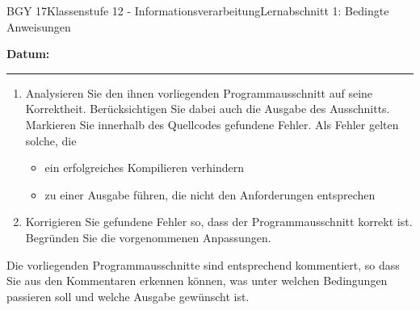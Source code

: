 \documentclass[oneside,openany,headings=optiontotoc,11pt,numbers=noenddot]{scrreprt}
\begin{document}
	\begin{worksheet}{BGY 17}{Klassenstufe 12 - Informationsverarbeitung}{Lernabschnitt 1: Bedingte Anweisungen}
				
		\noindent
		\sffamily
		\textbf{Datum:}
		\rule{0.91\textwidth}{0.4pt}
		\begin{framed}
			\noindent
			\begin{enumerate}
				\item Analysieren Sie den ihnen vorliegenden Programmausschnitt auf seine Korrektheit. Berücksichtigen Sie dabei auch die Ausgabe des Ausschnitts.\\
				Markieren Sie innerhalb des Quellcodes gefundene Fehler. Als Fehler gelten solche, die
				\begin{itemize}
					\item ein erfolgreiches Kompilieren verhindern
					\item zu einer Ausgabe führen, die nicht den Anforderungen entsprechen
				\end{itemize}
				\item Korrigieren Sie gefundene Fehler so, dass der Programmausschnitt korrekt ist.\\
				Begründen Sie die vorgenommenen Anpassungen.
			\end{enumerate}
			\par\noindent
			Die vorliegenden Programmausschnitte sind entsprechend kommentiert, so dass Sie aus den Kommentaren erkennen können, was unter welchen Bedingungen passieren soll und welche Ausgabe gewünscht ist.
		\end{framed}
	\end{worksheet}
\end{document}
